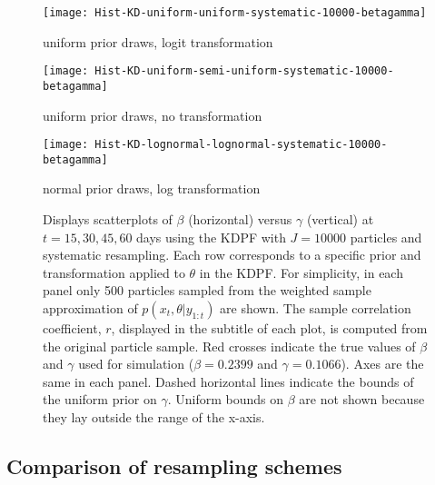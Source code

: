 \documentclass{elsarticle}
\begin{document}
\begin{figure}

\begin{minipage}{1.0\linewidth}
\texttt{[image: Hist-KD-uniform-uniform-systematic-10000-betagamma]}
\vspace{-1.0cm}
\caption*{uniform prior draws, logit transformation}
\end{minipage}

\vspace{0.5cm}

\begin{minipage}{1.0\linewidth}
\texttt{[image: Hist-KD-uniform-semi-uniform-systematic-10000-betagamma]}
\vspace{-1.0cm}
\caption*{uniform prior draws, no transformation}
\end{minipage}

\vspace{0.5cm}

\begin{minipage}{1.0\linewidth}
\texttt{[image: Hist-KD-lognormal-lognormal-systematic-10000-betagamma]}
\vspace{-1.0cm}
\caption*{normal prior draws, log transformation}
\end{minipage}

\caption{Displays scatterplots of $\beta$ (horizontal) versus $\gamma$ (vertical) at $t = 15, 30, 45, 60$ days using the KDPF with $J = 10000$ particles and systematic resampling. Each row corresponds to a specific prior and transformation applied to $\theta$ in the KDPF. For simplicity, in each panel only 500 particles sampled from the weighted sample approximation of $p(x_t,\theta|y_{1:t})$ are shown. The sample correlation coefficient, $r$, displayed in the subtitle of each plot, is computed from the original particle sample. Red crosses indicate the true values of $\beta$ and $\gamma$ used for simulation ($\beta = 0.2399$ and $\gamma = 0.1066$). Axes are the same in each panel. Dashed horizontal lines indicate the bounds of the uniform prior on $\gamma$. Uniform bounds on $\beta$ are not shown because they lay outside the range of the x-axis.} \label{fig:priors}

\end{figure}

\subsection{Comparison of resampling schemes \label{sec:resample}}
\end{document}
